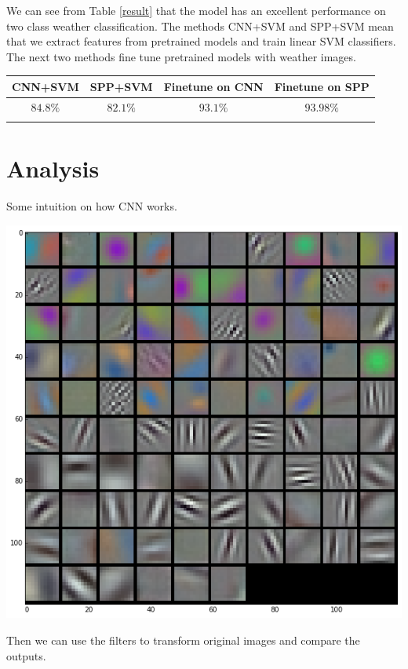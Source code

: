 \documentclass[a0,portrait]{a0poster}
\begin{document}
\begin{multicols}{2}
We can see from Table \ref{result} that the model has an excellent performance on two class weather classification. The methods CNN+SVM and SPP+SVM mean that we extract features from pretrained models and train linear SVM classifiers. The next two methods fine tune pretrained models with weather images. 

%
\begin{center}
\begin{tabular}{c c c c}
\toprule
\textbf{CNN+SVM} & \textbf{SPP+SVM} & \textbf{Finetune on CNN}& \textbf{Finetune on SPP}\\
\midrule
$84.8\%$ & $82.1\%$ & $93.1\%$ & $93.98\%$ \\

\bottomrule
\label{result}
\end{tabular}
\end{center}


\section*{Analysis}

Some intuition on how CNN works.
\begin{center}\vspace{1cm}
\includegraphics[width=0.3\linewidth]{conv1_params.png}
\end{center}\vspace{1cm}

Then we can use the filters to transform original images and compare the outputs.


\end{multicols}
\end{document}
